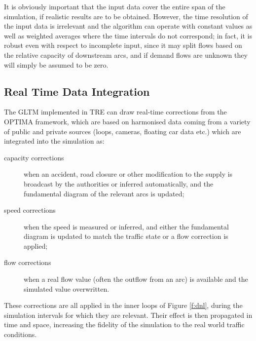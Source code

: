 It is obviously important that the input data cover the entire span of the simulation, if realistic results are to be obtained.
However, the time resolution of the input data is irrelevant and the algorithm can operate with constant values as well as weighted averages where the time intervals do not correspond; in fact, it is robust even with respect to incomplete input, since it may split flows based on the relative capacity of downstream arcs, and if demand flows are unknown they will simply be assumed to be zero.


\subsection{Real Time Data Integration}
The GLTM implemented in TRE can draw real-time corrections from the OPTIMA framework, which are based on harmonised data coming from a variety of public and private sources (loops, cameras, floating car data etc.) which are integrated into the simulation as:
\begin{description}
\item[capacity corrections] when an accident, road closure or other modification to the supply is broadcast by the authorities or inferred automatically, and the fundamental diagram of the relevant arcs is updated;
\item[speed corrections] when the speed is measured or inferred, and either the fundamental diagram is updated to match the traffic state or a flow correction is applied;
\item[flow corrections] when a real flow value (often the outflow from an arc) is available and the simulated value overwritten.
\end{description}

These corrections are all applied in the inner loops of Figure \ref{f:dnl}, during the simulation intervals for which they are relevant. Their effect is then propagated in time and space, increasing the fidelity of the simulation to the real world traffic conditions.


